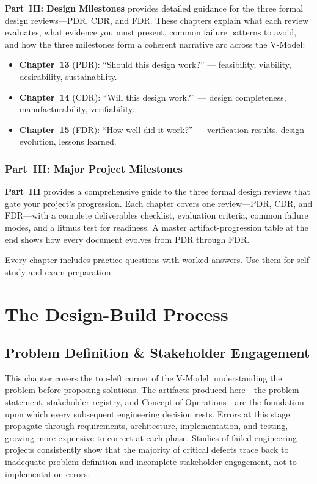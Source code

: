 \documentclass[11pt,letterpaper,twoside,openany]{book}
\begin{document}
\textbf{Part~III: Design Milestones} provides detailed guidance for the three formal design reviews---PDR, CDR, and FDR. These chapters explain what each review evaluates, what evidence you must present, common failure patterns to avoid, and how the three milestones form a coherent narrative arc across the V-Model:

\begin{itemize}[nosep,leftmargin=1.5em]
\item \textbf{Chapter~13} (PDR): ``Should this design work?'' --- feasibility, viability, desirability, sustainability.
\item \textbf{Chapter~14} (CDR): ``Will this design work?'' --- design completeness, manufacturability, verifiability.
\item \textbf{Chapter~15} (FDR): ``How well did it work?'' --- verification results, design evolution, lessons learned.
\end{itemize}

\section*{Part~III: Major Project Milestones}

\textbf{Part~III} provides a comprehensive guide to the three formal design reviews that gate your project's progression. Each chapter covers one review---PDR, CDR, and FDR---with a complete deliverables checklist, evaluation criteria, common failure modes, and a litmus test for readiness. A master artifact-progression table at the end shows how every document evolves from PDR through FDR.

Every chapter includes practice questions with worked answers. Use them for self-study and exam preparation.

\mainmatter


\part{The Design-Build Process}

\FloatBarrier
\chapter{Problem Definition \& Stakeholder Engagement}

\vspace{1em}

This chapter covers the top-left corner of the V-Model: understanding the problem before proposing solutions. The artifacts produced here---the problem statement, stakeholder registry, and Concept of Operations---are the foundation upon which every subsequent engineering decision rests. Errors at this stage propagate through requirements, architecture, implementation, and testing, growing more expensive to correct at each phase. Studies of failed engineering projects consistently show that the majority of critical defects trace back to inadequate problem definition and incomplete stakeholder engagement, not to implementation errors.
\end{document}
